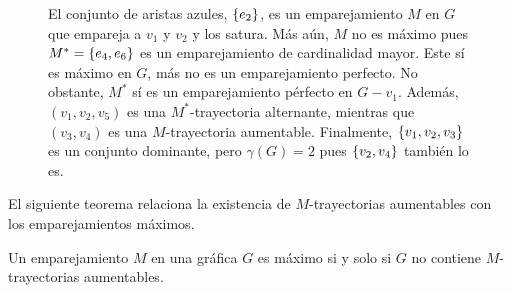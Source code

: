 \begin{figure}[ht!]
  \centering
  \captionsetup{font=footnotesize}
  \caption{El conjunto de aristas azules, $\left\{ e_2\right\}$, es un emparejamiento $M$ en
  $G$ que empareja a $v_1$ y $v_2$ y los satura. M\'as a\'un, $M$ no es m\'aximo
  pues $M^*=\left\{ e_4,e_6\right\}$ es un emparejamiento de cardinalidad mayor. Este s\'i
  es m\'aximo en $G$, m\'as no es un emparejamiento perfecto. No obstante, $M^*$
  s\'i es un emparejamiento p\'erfecto en $G-v_1$. Adem\'as, $(v_1,v_2,v_5)$ es
  una $M^*$-trayectoria alternante, mientras que $(v_3,v_4)$ es una
  $M$-trayectoria aumentable. Finalmente, $\left\{ v_1,v_2,v_3\right\}$ es un conjunto
  dominante, pero $\gamma(G)=2$ pues $\left\{ v_2,v_4\right\}$ tambi\'en lo es.}
  \label{fig:grafica-dibujo5}
\end{figure}

\newpage
El siguiente teorema relaciona la existencia de $M$-trayectorias aumentables con
los emparejamientos m\'aximos.

\begin{teorema}
\label{teo:berge}
  Un emparejamiento $M$ en una gr\'afica $G$ es m\'aximo si y solo si $G$ no
  contiene $M$-trayectorias aumentables.
\end{teorema}

